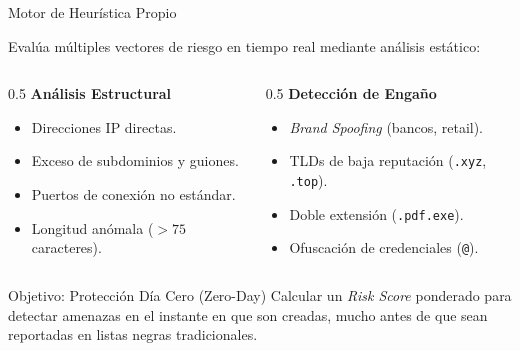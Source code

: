 \documentclass{beamer}
\begin{document}
\begin{frame}{Motor de Heurística Propio}

Evalúa múltiples vectores de riesgo en tiempo real mediante análisis estático:

\vspace{0.2cm}

\begin{columns}[T]
    \begin{column}{0.5\textwidth}
        \textbf{Análisis Estructural}
        \begin{itemize}
            \item Direcciones IP directas.
            \item Exceso de subdominios y guiones.
            \item Puertos de conexión no estándar.
            \item Longitud anómala ($>75$ caracteres).
        \end{itemize}
    \end{column}
    
    \begin{column}{0.5\textwidth}
        \textbf{Detección de Engaño}
        \begin{itemize}
            \item \textit{Brand Spoofing} (bancos, retail).
            \item TLDs de baja reputación (\texttt{.xyz}, \texttt{.top}).
            \item Doble extensión (\texttt{.pdf.exe}).
            \item Ofuscación de credenciales (\texttt{@}).
        \end{itemize}
    \end{column}
\end{columns}

\vspace{0.5cm}

\begin{block}{Objetivo: Protección Día Cero (Zero-Day)}
Calcular un \textit{Risk Score} ponderado para detectar amenazas en el instante en que son creadas, mucho antes de que sean reportadas en listas negras tradicionales.
\end{block}

\end{frame}
\end{document}
